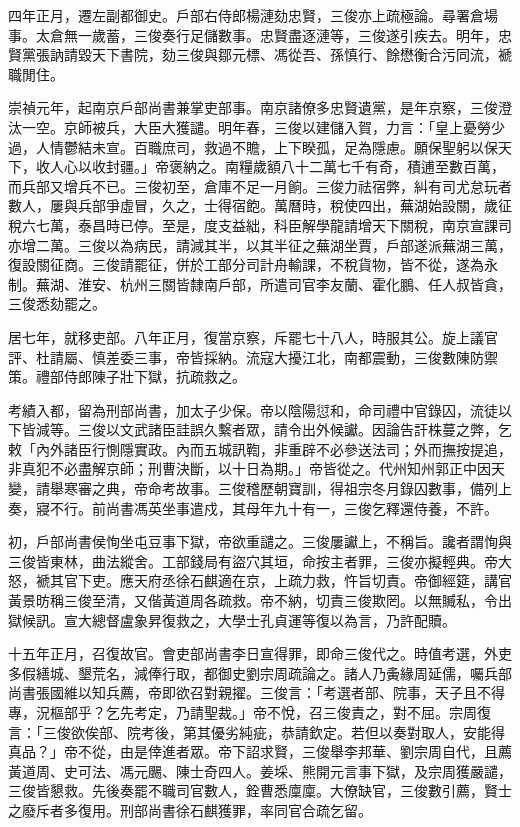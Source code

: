 \begin{pinyinscope}
四年正月，遷左副都御史。戶部右侍郎楊漣劾忠賢，三俊亦上疏極論。尋署倉場事。太倉無一歲蓄，三俊奏行足儲數事。忠賢盡逐漣等，三俊遂引疾去。明年，忠賢黨張訥請毀天下書院，劾三俊與鄒元標、馮從吾、孫慎行、餘懋衡合污同流，褫職閒住。

崇禎元年，起南京戶部尚書兼掌吏部事。南京諸僚多忠賢遺黨，是年京察，三俊澄汰一空。京師被兵，大臣大獲譴。明年春，三俊以建儲入賀，力言：「皇上憂勞少過，人情鬱結未宣。百職庶司，救過不贍，上下睽孤，足為隱慮。願保聖躬以保天下，收人心以收封疆。」帝褒納之。南糧歲額八十二萬七千有奇，積逋至數百萬，而兵部又增兵不已。三俊初至，倉庫不足一月餉。三俊力祛宿弊，糾有司尤怠玩者數人，屢與兵部爭虛冒，久之，士得宿飽。萬曆時，稅使四出，蕪湖始設關，歲征稅六七萬，泰昌時已停。至是，度支益絀，科臣解學龍請增天下關稅，南京宣課司亦增二萬。三俊以為病民，請減其半，以其半征之蕪湖坐賈，戶部遂派蕪湖三萬，復設關征商。三俊請罷征，併於工部分司計舟輸課，不稅貨物，皆不從，遂為永制。蕪湖、淮安、杭州三關皆隸南戶部，所遣司官李友蘭、霍化鵬、任人叔皆貪，三俊悉劾罷之。

居七年，就移吏部。八年正月，復當京察，斥罷七十八人，時服其公。旋上議官評、杜請屬、慎差委三事，帝皆採納。流寇大擾江北，南都震動，三俊數陳防禦策。禮部侍郎陳子壯下獄，抗疏救之。

考績入都，留為刑部尚書，加太子少保。帝以陰陽愆和，命司禮中官錄囚，流徒以下皆減等。三俊以文武諸臣詿誤久繫者眾，請令出外候讞。因論告訐株蔓之弊，乞敕「內外諸臣行惻隱實政。內而五城訊鞫，非重辟不必參送法司；外而撫按提追，非真犯不必盡解京師；刑曹決斷，以十日為期。」帝皆從之。代州知州郭正中因天變，請舉寒審之典，帝命考故事。三俊稽歷朝寶訓，得祖宗冬月錄囚數事，備列上奏，寢不行。前尚書馮英坐事遣戍，其母年九十有一，三俊乞釋還侍養，不許。

初，戶部尚書侯恂坐屯豆事下獄，帝欲重譴之。三俊屢讞上，不稱旨。讒者謂恂與三俊皆東林，曲法縱舍。工部錢局有盜穴其垣，命按主者罪，三俊亦擬輕典。帝大怒，褫其官下吏。應天府丞徐石麒適在京，上疏力救，忤旨切責。帝御經筵，講官黃景昉稱三俊至清，又偕黃道周各疏救。帝不納，切責三俊欺罔。以無贓私，令出獄候訊。宣大總督盧象昇復救之，大學士孔貞運等復以為言，乃許配贖。

十五年正月，召復故官。會吏部尚書李日宣得罪，即命三俊代之。時值考選，外吏多假繕城、墾荒名，減俸行取，都御史劉宗周疏論之。諸人乃夤緣周延儒，囑兵部尚書張國維以知兵薦，帝即欲召對親擢。三俊言：「考選者部、院事，天子且不得專，況樞部乎？乞先考定，乃請聖裁。」帝不悅，召三俊責之，對不屈。宗周復言：「三俊欲俟部、院考後，第其優劣純疵，恭請欽定。若但以奏對取人，安能得真品？」帝不從，由是倖進者眾。帝下詔求賢，三俊舉李邦華、劉宗周自代，且薦黃道周、史可法、馮元颺、陳士奇四人。姜埰、熊開元言事下獄，及宗周獲嚴譴，三俊皆懇救。先後奏罷不職司官數人，銓曹悉廩廩。大僚缺官，三俊數引薦，賢士之廢斥者多復用。刑部尚書徐石麒獲罪，率同官合疏乞留。


\end{pinyinscope}
